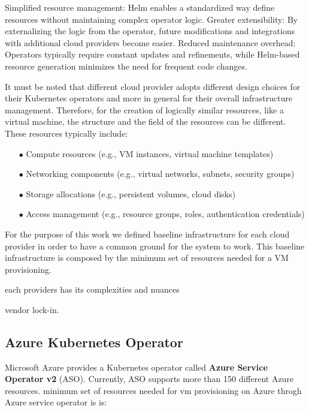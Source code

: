 Simplified resource management:  Helm enables a standardized way define resources without maintaining complex operator logic.
Greater extensibility:  By externalizing the logic from the operator, future modifications and integrations with additional cloud providers become easier.
Reduced maintenance overhead: Operators typically require constant updates and refinements, while Helm-based resource generation minimizes the need for frequent code changes.

It must be noted that different cloud provider adopts different design choices for their Kubernetes operators and more in general for their overall infrastructure management. Therefore, for the creation of logically similar resources, like a virtual machine, the structure and the field of the resources can be different. 
These resources typically include:
\begin{itemize}[itemsep=0.2pt, topsep=1pt]
  \item[$\bullet$] Compute resources (e.g., VM instances, virtual machine templates)
  \item[$\bullet$] Networking components (e.g., virtual networks, subnets, security groups)
  \item[$\bullet$] Storage allocations (e.g., persistent volumes, cloud disks)
  \item[$\bullet$] Access management (e.g., resource groups, roles, authentication credentials)
\end{itemize}


For the purpose of this work we defined baseline infrastructure for each cloud provider in order to have a common ground for the system to work. This baseline infrastructure is composed by the minimum set of resources needed for a VM provisioning.

each providers has its complexities and nuances

vendor lock-in.





\newpage

\subsection{Azure Kubernetes Operator}

Microsoft Azure provides a Kubernetes operator called \textbf{Azure Service Operator v2} (ASO).
Currently, ASO supports more than 150 different Azure resources.
minimum set of resources needed for vm provisioning on Azure throgh Azure service operator is is:

